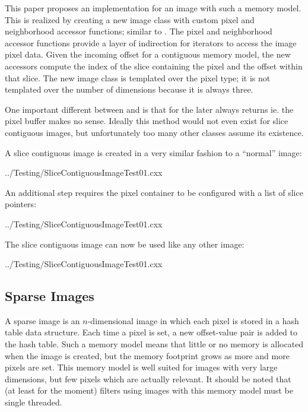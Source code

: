 \documentclass{InsightArticle}
\begin{document}
This paper proposes an implementation for an image with such a memory model.
This is realized by creating a new image class with custom
pixel and neighborhood accessor functions;
similar to .
The pixel and neighborhood accessor functions provide a layer of
indirection for iterators to access the image pixel data.
Given the incoming offset for a contiguous memory model,
the new accessors compute the index of the slice containing the pixel
and the offset within that slice.
The new image class is templated over the pixel type;
it is not templated over the number of dimensions because it is always three.

One important different between  and 
is that for the later  always returns 
ie. the pixel buffer makes no sense.
Ideally this method would not even exist for slice contiguous images,
but unfortunately too many other classes assume its existence.

A slice contiguous image is created in a very similar fashion to a ``normal'' image:
\listcpluspluspsnip

                 {../Testing/SliceContiguousImageTest01.cxx}

An additional step requires the pixel container to be configured
with a list of slice pointers:
\listcpluspluspsnip

                 {../Testing/SliceContiguousImageTest01.cxx}

The slice contiguous image can now be used like any other image:
\listcpluspluspsnip

                 {../Testing/SliceContiguousImageTest01.cxx}

\vspace{-10mm}
\subsection{Sparse Images}
A sparse image is an $n$-dimensional image in which each pixel is stored
in a hash table data structure.
Each time a pixel is set, a new offset-value pair is added to the hash table.
Such a memory model means that little or no memory is allocated when the
image is created, but the memory footprint grows as more and more pixels
are set.
This memory model is well suited for images with very large dimensions,
but few pixels which are actually relevant.
It should be noted that (at least for the moment) filters using images
with this memory model must be single threaded.
\end{document}
